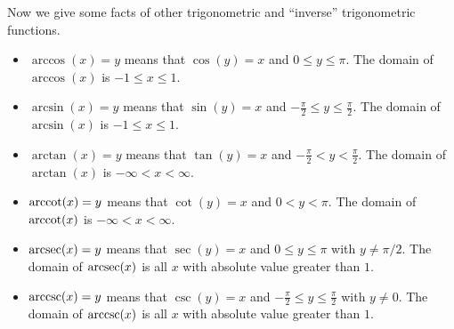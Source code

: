 \documentclass{ximera}
\begin{document}
\begin{example}
\begin{explanation}
%                    
  \end{explanation}
\end{example}


Now we give some facts of other trigonometric and ``inverse''
trigonometric functions.

\begin{definition}\hfil
  \begin{itemize}
    \item $\arccos(x) = y$ means that $\cos(y) = x$ and
      $0\le y\le \pi$. The domain of $\arccos(x)$ is $-1\le x\le
      1$.
    \item $\arcsin(x) = y$ means that $\sin(y) = x$ and
      $-\frac{\pi}{2}\le y\le \frac{\pi}{2}$. The domain of
      $\arcsin(x)$ is $-1\le x\le 1$.
    \item $\arctan(x) = y$ means that $\tan(y) = x$ and
      $-\frac{\pi}{2}< y< \frac{\pi}{2}$. The domain of
      $\arctan(x)$ is $-\infty<x<\infty$.
    \item $\operatorname{arccot}(x) =y$ means that $\cot(y) = x$ and
      $0< y< \pi$. The domain of $\operatorname{arccot}(x)$ is
      $-\infty<x<\infty$.
    \item $\operatorname{arcsec}(x) = y$ means that $\sec(y) = x$ and
      $0\le y\le \pi$ with $y\ne \pi/2$. The domain of
      $\operatorname{arcsec}(x)$ is all $x$ with absolute value greater than $1$.
    \item $\operatorname{arccsc}(x) = y$ means that $\csc(y) = x$ and
      $-\frac{\pi}{2}\le y\le \frac{\pi}{2}$ with $y \ne 0$. The
      domain of $\operatorname{arccsc}(x)$ is all $x$ with absolute value greater
      than $1$.
  \end{itemize}
\end{definition}
\end{document}

